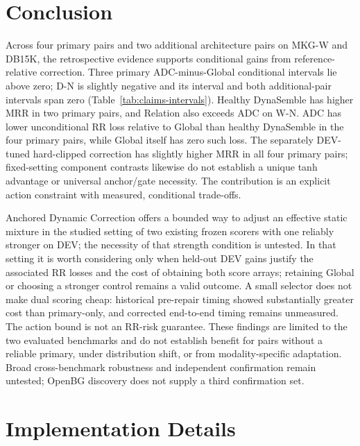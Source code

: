 \documentclass[11pt,a4paper]{article}
\begin{document}
\section{Conclusion}
Across four primary pairs and two additional architecture pairs on MKG-W and DB15K, the retrospective evidence supports conditional gains from reference-relative correction. Three primary ADC-minus-Global conditional intervals lie above zero; D-N is slightly negative and its interval and both additional-pair intervals span zero (Table~\ref{tab:claims-intervals}). Healthy DynaSemble has higher MRR in two primary pairs, and Relation also exceeds ADC on W-N. ADC has lower unconditional RR loss relative to Global than healthy DynaSemble in the four primary pairs, while Global itself has zero such loss. The separately DEV-tuned hard-clipped correction has slightly higher MRR in all four primary pairs; fixed-setting component contrasts likewise do not establish a unique tanh advantage or universal anchor/gate necessity. The contribution is an explicit action constraint with measured, conditional trade-offs.

Anchored Dynamic Correction offers a bounded way to adjust an effective static mixture in the studied setting of two existing frozen scorers with one reliably stronger on DEV; the necessity of that strength condition is untested. In that setting it is worth considering only when held-out DEV gains justify the associated RR losses and the cost of obtaining both score arrays; retaining Global or choosing a stronger control remains a valid outcome. A small selector does not make dual scoring cheap: historical pre-repair timing showed substantially greater cost than primary-only, and corrected end-to-end timing remains unmeasured. The action bound is not an RR-risk guarantee. These findings are limited to the two evaluated benchmarks and do not establish benefit for pairs without a reliable primary, under distribution shift, or from modality-specific adaptation. Broad cross-benchmark robustness and independent confirmation remain untested; OpenBG discovery does not supply a third confirmation set.
\FloatBarrier
\begingroup\small


\endgroup

\FloatBarrier
\appendix
\section{Implementation Details}
\label{app:implementation}
\end{document}
